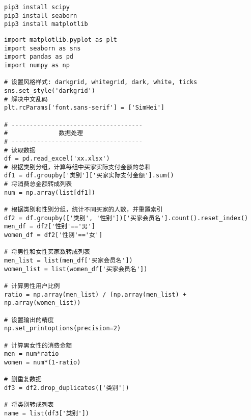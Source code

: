 \documentclass[a4paper]{ctexart}    %
\begin{document}
\begin{tcolorbox}[
         colback=red!5!white,
         colframe=teal,
         title=\textbf{Install Seaborn}
    ]
\begin{verbatim}
pip3 install scipy
pip3 install seaborn
pip3 install matplotlib
\end{verbatim}
\end{tcolorbox}

\newpage
\begin{tcolorbox}[
         colback=red!5!white,
         colframe=teal,
         title=\textbf{seaborn (堆叠)柱状图1/2}
    ]
\begin{verbatim}
import matplotlib.pyplot as plt
import seaborn as sns
import pandas as pd
import numpy as np

# 设置风格样式: darkgrid, whitegrid, dark, white, ticks
sns.set_style('darkgrid')
# 解决中文乱码
plt.rcParams['font.sans-serif'] = ['SimHei']

# ------------------------------------
#              数据处理
# ------------------------------------
# 读取数据
df = pd.read_excel('xx.xlsx')
# 根据类别分组，计算每组中买家实际支付金额的总和
df1 = df.groupby['类别']['买家实际支付金额'].sum()
# 将消费总金额转成列表
num = np.array(list[df1])

# 根据类别和性别分组，统计不同买家的人数，并重置索引
df2 = df.groupby(['类别', '性别'])['买家会员名'].count().reset_index()
men_df = df2['性别'=='男']
women_df = df2['性别'=='女']

# 将男性和女性买家数转成列表
men_list = list(men_df['买家会员名'])
women_list = list(women_df['买家会员名'])

# 计算男性用户比例
ratio = np.array(men_list) / (np.array(men_list) + np.array(women_list))

# 设置输出的精度
np.set_printoptions(precision=2)

# 计算男女性的消费金额
men = num*ratio
women = num*(1-ratio)

# 删重复数据
df3 = df2.drop_duplicates(['类别'])

# 将类别转成列表
name = list(df3['类别'])
\end{verbatim}
\end{tcolorbox}
\end{document}
